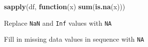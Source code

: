 \documentclass[10,portrait]{article}
\newenvironment{Shaded}{\begin{snugshade}}{\end{snugshade}}
\newcommand{\KeywordTok}[1]{\textcolor[rgb]{0.13,0.29,0.53}{\textbf{#1}}}
\newcommand{\StringTok}[1]{\textcolor[rgb]{0.31,0.60,0.02}{#1}}
\newcommand{\OtherTok}[1]{\textcolor[rgb]{0.56,0.35,0.01}{#1}}
\newcommand{\ControlFlowTok}[1]{\textcolor[rgb]{0.13,0.29,0.53}{\textbf{#1}}}
\newcommand{\OperatorTok}[1]{\textcolor[rgb]{0.81,0.36,0.00}{\textbf{#1}}}
\newcommand{\NormalTok}[1]{#1}
\begin{document}
\begin{Shaded}
\begin{Highlighting}[]
\KeywordTok{sapply}\NormalTok{(df, }\ControlFlowTok{function}\NormalTok{(x) }\KeywordTok{sum}\NormalTok{(}\KeywordTok{is.na}\NormalTok{(x)))}
\end{Highlighting}
\end{Shaded}

Replace \texttt{NaN} and \texttt{Inf} values with \texttt{NA}

\begin{Shaded}
\end{Shaded}

Fill in missing data values in sequence with \texttt{NA}
\end{document}
